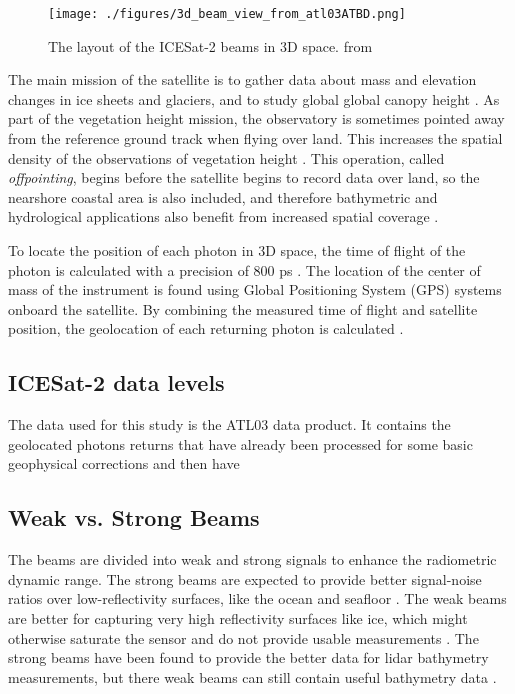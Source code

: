 \begin{figure}[htbp]
      \centering
      \texttt{[image: ./figures/3d\_beam\_view\_from\_atl03ATBD.png]}
      \caption{The layout of the ICESat-2 beams in 3D space. from \cite{Neumann2019d}}
      \label{3d-beams}
\end{figure}


The main mission of the satellite is to gather data about mass and elevation changes in ice sheets and glaciers, and to study global global canopy height \parencite{Markus2017}. As part of the vegetation height mission, the observatory is sometimes pointed away from the reference ground track when flying over land. This increases the spatial density of the observations of vegetation height \parencite{Markus2017}. This operation, called  \emph{offpointing}, begins before the satellite begins to record data over land, so the nearshore coastal area is also included, and therefore bathymetric and hydrological applications also benefit from increased spatial coverage \parencite{Magruder2021}.

To locate the position of each photon in 3D space, the time of flight of the photon is calculated with a precision of 800 ps \parencite{Neumann2019d}. The location of the center of mass of the instrument is found using Global Positioning System (GPS) systems onboard the satellite. By combining the measured time of flight and satellite position, the geolocation of each returning photon is calculated \parencite{Neumann2019d}.


\subsection{ICESat-2 data levels}
The data used for this study is the ATL03 data product. It contains the geolocated photons returns that have already been processed for some basic geophysical corrections and then have
\subsection{Weak vs. Strong Beams}

The beams are divided into weak and strong signals to enhance the radiometric dynamic range. The strong beams are expected to provide better signal-noise ratios over low-reflectivity surfaces, like the ocean and seafloor \parencite{Neumann2019d}. The weak beams are better for capturing very high reflectivity surfaces like ice, which might otherwise saturate the sensor and do not provide usable measurements \parencite{}. The strong beams have been found to provide the better data for lidar bathymetry measurements, but there weak beams can still contain useful bathymetry data \parencite{add citation}.

